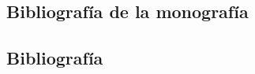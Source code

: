 \subsection{Bibliografía de la monografía}

\nocite{*}
\printbibliography[keyword={08-monografia}]

\subsection{Bibliografía}

\nocite{*}
\printbibliography[keyword={08}]